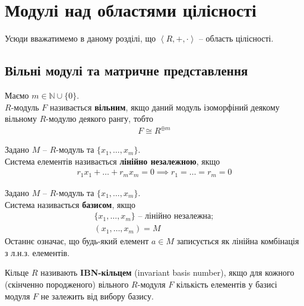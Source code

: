 \documentclass{math_library}
\begin{document}
\fi

\iffalse
\section{Модулі над областями цілісності}
Усюди вважатимемо в даному розділі, що $\left<R,+,\cdot \right>$ -- область цілісності.

\subsection{Вільні модулі та матричне представлення}
\begin{definition}
Маємо $m \in \mathbb{N} \cup \{0\}$. \\
$R$-модуль $F$ називається \textbf{вільним}, якщо даний модуль ізоморфіний деякому вільному $R$-модулю деякого рангу, тобто
\begin{align*}
F \cong R^{\oplus m}
\end{align*}
\end{definition}

\begin{definition}
Задано $M$ -- $R$-модуль та $\{x_1,\dots,x_m\}$.\\
Система елементів називається \textbf{лінійно незалежною}, якщо
\begin{align*}
r_1 x_1 + \dots + r_m x_m = 0 \implies r_1 = \dots = r_m = 0
\end{align*}
\end{definition}

\begin{definition}
Задано $M$ -- $R$-модуль та $\{x_1,\dots,x_m\}$.\\
Система називається \textbf{базисом}, якщо
\begin{align*}
\{x_1,\dots,x_m\} \text{ -- лінійно незалежна}; \\
(x_1,\dots,x_m) = M
\end{align*}
Останнє означає, що будь-який елемент $a \in M$ записується як лінійна комбінація з л.н.з. елементів.
\end{definition}

\begin{definition}
Кільце $R$ називають \textbf{IBN-кільцем} (invariant basis number), якщо для кожного (скінченно породженого) вільного $R$-модуля $F$ кількість елементів у базисі модуля $F$ не залежить від вибору базису.
\end{definition}
\end{document}
